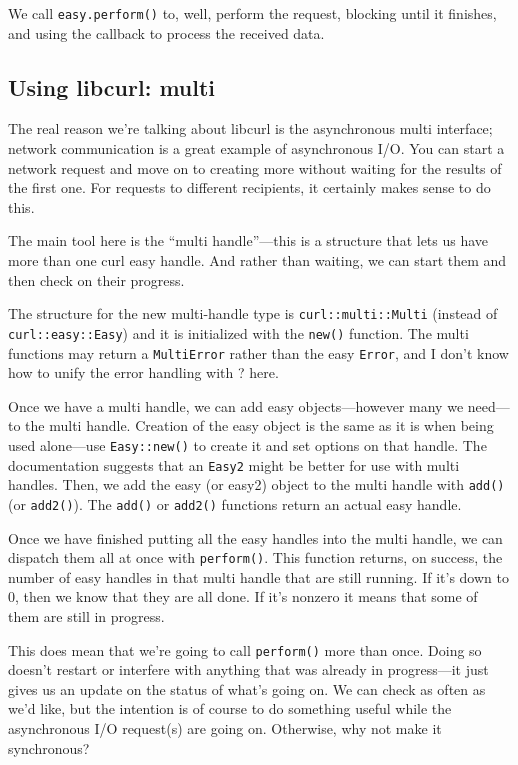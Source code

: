 \documentclass[a4paper]{report}
\begin{document}
We call \texttt{easy.perform()} to, well, perform the request, blocking until
it finishes, and using the callback to process the received data.

\subsection*{Using libcurl: multi}
The real reason we're talking about libcurl is the asynchronous multi interface;
network communication is a great example of asynchronous  I/O.
You can start a network request and move on to creating more without waiting for the results of the first one. For requests to different recipients, it certainly makes sense to do this.

The main tool here is the ``multi handle''---this is a structure that lets us have more than one curl easy handle. And rather than waiting, we can start them and then check on their progress. 

The structure for the new multi-handle type is \texttt{curl::multi::Multi} (instead of \texttt{curl::easy::Easy}) and it is initialized with the \texttt{new()} function. The multi functions may return a \texttt{MultiError} rather than the easy \texttt{Error}, and I don't know how to unify the error handling with ? here.

Once we have a multi handle, we can add easy objects---however many we need---to the multi handle. Creation of the easy object is the same as it is when being used alone---use \texttt{Easy::new()} to create it and set options on that handle. The documentation suggests that an \texttt{Easy2} might be better for use with multi handles. Then, we add the easy (or easy2) object to the multi handle with \texttt{add()} (or \texttt{add2()}). The \texttt{add()} or \texttt{add2()} functions return an actual easy handle.

Once we have finished putting all the easy handles into the multi handle, we can dispatch them all at once with \texttt{perform()}. This function returns, on success, the number of easy handles in that multi handle that are still running. If it's down to 0, then we know that they are all done. If it's nonzero it means that some of them are still in progress.

This does mean that we're going to call \texttt{perform()} more than once. Doing so doesn't restart or interfere with anything that was already in progress---it just gives us an update on the status of what's going on. We can check as often as we'd like, but the intention is of course to do something useful while the asynchronous I/O request(s) are going on. Otherwise, why not make it synchronous? 
\end{document}
